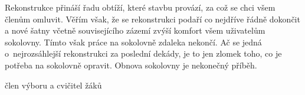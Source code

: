 \documentclass[11pt]{article}
\begin{document}
Rekonstrukce přináší řadu obtíží, které stavbu provází, za což se chci všem členům omluvit. Věřím však, že se rekonstrukci podaří co nejdříve řádně dokončit a nové šatny včetně souvisejícího zázemí zvýší komfort všem uživatelům sokolovny. Tímto však práce na sokolovně zdaleka nekončí. Ač se jedná o~nejrozsáhlejší rekonstrukci za poslední dekády, je to jen zlomek toho, co je potřeba na sokolovně opravit. Obnova sokolovny je nekonečný příběh.

\signature{Jan Přibyl}{člen výboru a cvičitel žáků}

\clearpage


\pagecolor{sokolred}
\color{white}
\renewcommand{\arraystretch}{1.4}

\newcommand{\boxheight}{13.5cm}

\vspace*{\fill}
\vspace*{0pt}
\end{document}
